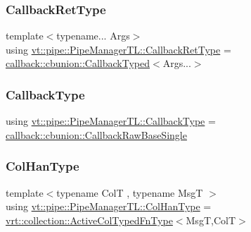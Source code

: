 \subsubsection{\texorpdfstring{Callback\+Ret\+Type}{CallbackRetType}}
{\footnotesize\ttfamily template$<$typename... Args$>$ \\
using \hyperlink{structvt_1_1pipe_1_1_pipe_manager_t_l_a456fdd18da932171fe8abab8bb213aa9}{vt\+::pipe\+::\+Pipe\+Manager\+T\+L\+::\+Callback\+Ret\+Type} =  \hyperlink{structvt_1_1pipe_1_1callback_1_1cbunion_1_1_callback_typed}{callback\+::cbunion\+::\+Callback\+Typed}$<$Args...$>$}

\mbox{\label{structvt_1_1pipe_1_1_pipe_manager_t_l_a1cc1d0f1c80a36488f9b5d282e9755d2}} 
\subsubsection{\texorpdfstring{Callback\+Type}{CallbackType}}
{\footnotesize\ttfamily using \hyperlink{structvt_1_1pipe_1_1_pipe_manager_t_l_a1cc1d0f1c80a36488f9b5d282e9755d2}{vt\+::pipe\+::\+Pipe\+Manager\+T\+L\+::\+Callback\+Type} =  \hyperlink{structvt_1_1pipe_1_1callback_1_1cbunion_1_1_callback_raw_base_single}{callback\+::cbunion\+::\+Callback\+Raw\+Base\+Single}}

\mbox{\label{structvt_1_1pipe_1_1_pipe_manager_t_l_a0bf4e2e805b3ce2be9f499e0e39aadfa}} 
\subsubsection{\texorpdfstring{Col\+Han\+Type}{ColHanType}}
{\footnotesize\ttfamily template$<$typename ColT , typename MsgT $>$ \\
using \hyperlink{structvt_1_1pipe_1_1_pipe_manager_t_l_a0bf4e2e805b3ce2be9f499e0e39aadfa}{vt\+::pipe\+::\+Pipe\+Manager\+T\+L\+::\+Col\+Han\+Type} =  \hyperlink{namespacevt_1_1vrt_1_1collection_a939327f58a5838cf9d7dcc7f14d1670c}{vrt\+::collection\+::\+Active\+Col\+Typed\+Fn\+Type}$<$MsgT,ColT$>$}

